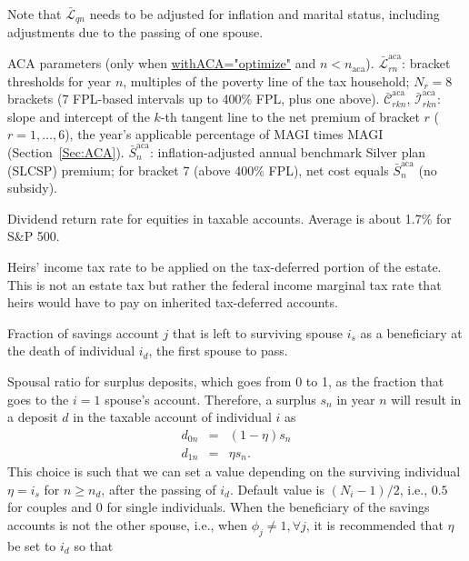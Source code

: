 \documentclass[fleqn,12pt]{report}
\newcommand{\code}[1]{\url{#1}}
\begin{document}
\begin{description}[leftmargin=4em,style=multiline]
        Note that $\bar{\mathcal{L}}_{qn}$ needs to be adjusted for inflation and marital status,
        including adjustments due to the passing of one spouse.
\item [$\bar{\mathcal{L}}^{\mathrm{aca}}_{rn}$, $\bar{\mathcal{C}}^{\mathrm{aca}}_{rkn}$, $\bar{\mathcal{I}}^{\mathrm{aca}}_{rkn}$, $\bar{S}^{\mathrm{aca}}_n$]
	ACA parameters (only when \code{withACA="optimize"} and $n < n_{\mathrm{aca}}$).
	$\bar{\mathcal{L}}^{\mathrm{aca}}_{rn}$: bracket thresholds for year $n$, multiples of the
	poverty line of the tax household;
	$N_r = 8$ brackets (7 FPL-based intervals up to 400\% FPL, plus one above).
	$\bar{\mathcal{C}}^{\mathrm{aca}}_{rkn}$, $\bar{\mathcal{I}}^{\mathrm{aca}}_{rkn}$: slope and intercept of
	the $k$-th tangent line to the net premium of bracket $r$ ($r = 1,\ldots,6$), the year's
	applicable percentage of MAGI times MAGI (Section~\ref{Sec:ACA}).
	$\bar{S}^{\mathrm{aca}}_n$: inflation-adjusted annual benchmark Silver plan (SLCSP) premium;
	for bracket 7 (above 400\% FPL), net cost equals $\bar{S}^{\mathrm{aca}}_n$ (no subsidy).
\item [$\mu$]
	Dividend return rate for equities in taxable accounts. Average is about 1.7\% for S\&P 500.
\item [$\nu$]
	Heirs' income tax rate to be applied on the tax-deferred portion of the estate. This is not an estate tax
	but rather the federal income marginal tax rate that heirs would have to pay on inherited tax-deferred accounts.
\item [$\phi_j$]
	Fraction of savings account $j$ that is left to surviving spouse $i_s$ as a beneficiary
	at the death of individual $i_d$, the first spouse to pass.
\item [$\eta$]
	Spousal ratio for surplus deposits, which goes from 0 to 1, as the fraction
	that goes to the $i = 1$ spouse's account. Therefore, a surplus $s_n$ in year $n$
	will result in a deposit $d$ in the taxable account of individual $i$ as
	\begin{eqnarray}
		\label{Eq:eta}
		d_{0n} & = & (1 - \eta) s_n \nonumber\\
		d_{1n} & = & \eta s_n.
	\end{eqnarray}
	This choice is such that we can set a value depending on the surviving
	individual $\eta = i_s$ for $n \ge n_d$, after the passing of $i_d$.
	Default value is $(N_i - 1)/2$, i.e., $0.5$ for couples and $0$ for single individuals.
	When the beneficiary of the savings accounts is not the other spouse, i.e., 
	when $\phi_j \neq 1, \forall j$, it is recommended that $\eta$ be set to $i_d$ so that

\end{description}
\end{document}
